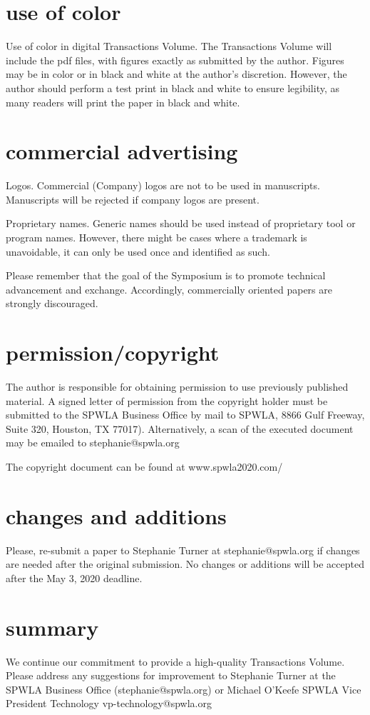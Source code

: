 \documentclass[10pt,twocolumn,twoside]{article}
\begin{document}
\section{use of color}
Use of color in digital Transactions Volume. The Transactions Volume will include the pdf files, with figures exactly as submitted by the author. Figures may be in color or in black and white at the author’s discretion. However, the author should perform a test print in black and white to ensure legibility, as many readers will print the paper in black and white. 

\section{commercial advertising}
Logos. Commercial (Company) logos are not to be used in manuscripts.  Manuscripts will be rejected if company logos are present. 

Proprietary names. Generic names should be used instead of proprietary tool or program names. However, there might be cases where a trademark is unavoidable, it can only be used once and identified as such.

Please remember that the goal of the Symposium is to promote technical advancement and exchange. Accordingly, commercially oriented papers are strongly discouraged.

\section{permission/copyright}
The author is responsible for obtaining permission to use previously published material. A signed letter of permission from the copyright holder must be submitted to the SPWLA Business Office by mail to SPWLA, 8866 Gulf Freeway, Suite 320, Houston, TX 77017). Alternatively, a scan of the executed document may be emailed to stephanie@spwla.org 

The copyright document can be found at www.spwla2020.com/ 

\section{changes and additions}
Please, re-submit a paper to Stephanie Turner at stephanie@spwla.org if changes are needed after the original submission. No changes or additions will be accepted after the May 3, 2020 deadline.

\section{summary}
We continue our commitment to provide a high-quality Transactions Volume. Please address any suggestions for improvement to Stephanie Turner at the SPWLA Business Office (stephanie@spwla.org) or Michael O’Keefe SPWLA Vice President Technology 
vp-technology@spwla.org
\end{document}
